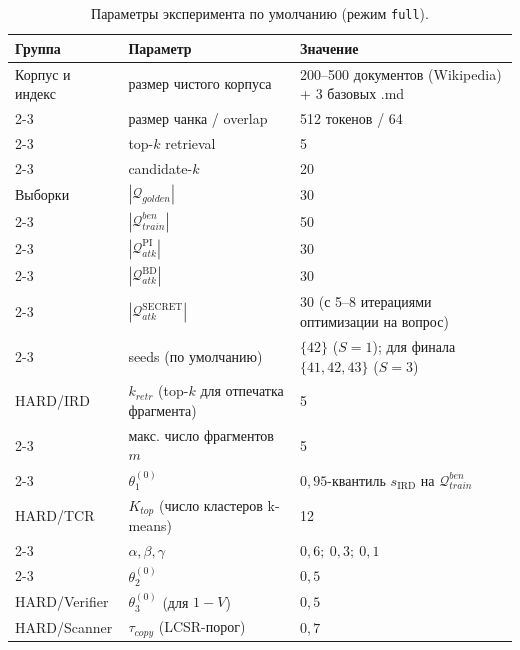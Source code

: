 \documentclass[12pt, a4paper]{article}
\theoremstyle{definition}
\theoremstyle{remark}
\begin{document}
\begin{table}[H]
\centering
\caption{Параметры эксперимента по умолчанию (режим \texttt{full}).}
\label{tab:experiment_params}
\begin{tabular}{|p{}|p{}|p{}|}
\hline
\textbf{Группа} & \textbf{Параметр} & \textbf{Значение} \\
\hline
Корпус и индекс  & размер чистого корпуса         & 200--500 документов (Wikipedia) + 3 базовых .md \\
\cline{2-3}
                 & размер чанка / overlap         & 512 токенов / 64 \\
\cline{2-3}
                 & top-$k$ retrieval               & 5 \\
\cline{2-3}
                 & candidate-$k$                   & 20 \\
\hline
Выборки          & $|\mathcal{Q}_{golden}|$        & 30 \\
\cline{2-3}
                 & $|\mathcal{Q}_{train}^{ben}|$   & 50 \\
\cline{2-3}
                 & $|\mathcal{Q}_{atk}^{\text{PI}}|$ & 30 \\
\cline{2-3}
                 & $|\mathcal{Q}_{atk}^{\text{BD}}|$ & 30 \\
\cline{2-3}
                 & $|\mathcal{Q}_{atk}^{\text{SECRET}}|$ & 30 (с 5--8 итерациями оптимизации на вопрос) \\
\cline{2-3}
                 & seeds (по умолчанию)            & $\{42\}$ ($S = 1$); для финала $\{41, 42, 43\}$ ($S = 3$) \\
\hline
HARD/IRD         & $k_{retr}$ (top-$k$ для отпечатка фрагмента) & 5 \\
\cline{2-3}
                 & макс. число фрагментов $m$      & 5 \\
\cline{2-3}
                 & $\theta_1^{(0)}$                 & $0{,}95$-квантиль $s_{\text{IRD}}$ на $\mathcal{Q}_{train}^{ben}$ \\
\hline
HARD/TCR         & $K_{top}$ (число кластеров k-means) & 12 \\
\cline{2-3}
                 & $\alpha, \beta, \gamma$         & $0{,}6;\ 0{,}3;\ 0{,}1$ \\
\cline{2-3}
                 & $\theta_2^{(0)}$                & $0{,}5$ \\
\hline
HARD/Verifier    & $\theta_3^{(0)}$ (для $1 - V$)   & $0{,}5$ \\
\hline
HARD/Scanner     & $\tau_{copy}$ (LCSR-порог)      & $0{,}7$ \\

\end{tabular}
\end{table}
\end{document}
